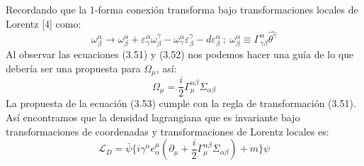 Recordando que la 1-forma conexión transforma bajo transformaciones locales de Lorentz [4] como:
\begin{equation}
\omega_{\beta}^{\alpha}\to\omega_{\beta}^{\alpha}+\varepsilon_{\gamma}^{\alpha}\omega_{\beta}^{\gamma}-\omega_{\gamma}^{\alpha}\varepsilon_{\beta}^{\gamma}-d\varepsilon_{\beta}^{\alpha} \ ; \ \omega_{\beta}^{\alpha}\equiv\Gamma_{\gamma\beta}^{\alpha}\hat{\theta^{\gamma}}
\end{equation}
Al observar las ecuaciones (3.51) y (3.52) nos podemos hacer una guía de lo que debería ser una propuesta para $\Omega_\mu$, así:
\begin{equation}
\Omega_{\mu}=\frac{i}{2}\Gamma_{\mu}^{\alpha\beta}\Sigma_{\alpha\beta}
\end{equation} 
La propuesta de la ecuación (3.53) cumple con la regla de transformación (3.51). Así encontramos que la densidad lagrangiana que es invariante bajo transformaciones de coordenadas y transformaciones de Lorentz locales es:
\begin{equation}
\mathcal{L}_{D}=\bar{\psi}\{i\gamma^{\alpha}e_{\alpha}^{\mu}(\partial_{\mu}+\frac{i}{2}\Gamma_{\mu}^{\alpha\beta}\Sigma_{\alpha\beta})+m\}\psi
\end{equation}


